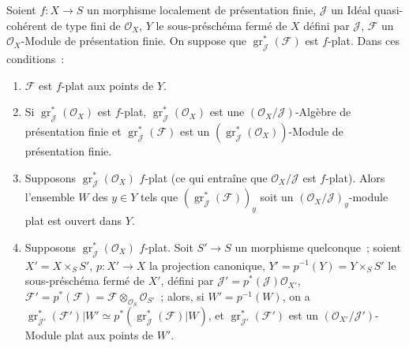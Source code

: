 \begin{proposition}[11.3.4]
Soient $f:X\to S$ un morphisme localement de présentation finie, $\mathcal J$
un Idéal quasi-cohérent de type fini de $\mathcal O_X$, $Y$ le sous-préschéma
fermé de $X$ défini par $\mathcal J$, $\mathcal F$ un $\mathcal O_X$-Module de
présentation finie. On suppose que $\operatorname{gr}_{\mathcal J}^*(\mathcal F)$
est $f$-plat. Dans ces conditions~:
\begin{enumerate}[label=\emph{(\roman*)}]
\item $\mathcal F$ est $f$-plat aux points de $Y$.
\item Si $\operatorname{gr}_{\mathcal J}^*(\mathcal O_X)$ est $f$-plat,
$\operatorname{gr}_{\mathcal J}^*(\mathcal O_X)$ est une
$(\mathcal O_X/\mathcal J)$-Algèbre de présentation finie et
$\operatorname{gr}_{\mathcal J}^*(\mathcal F)$ est un
$(\operatorname{gr}_{\mathcal J}^*(\mathcal O_X))$-Module de présentation
finie.
\item Supposons $\operatorname{gr}_{\mathcal J}^*(\mathcal O_X)$ $f$-plat
(ce qui entraîne que $\mathcal O_X/\mathcal J$ est $f$-plat). Alors l'ensemble
$W$ des $y\in Y$ tels que $(\operatorname{gr}_{\mathcal J}^*(\mathcal F))_y$
soit un $(\mathcal O_X/\mathcal J)_y$-module plat est ouvert dans $Y$.
\item Supposons $\operatorname{gr}_{\mathcal J}^*(\mathcal O_X)$ $f$-plat.
Soit $S'\to S$ un morphisme quelconque~; soient $X'=X\times_SS'$,
$p:X'\to X$ la projection canonique, $Y'=p^{-1}(Y)=Y\times_SS'$ le
sous-préschéma fermé de $X'$, défini par
$\mathcal J'=p^*(\mathcal J)\mathcal O_{X'}$, $\mathcal F'=p^*(\mathcal F)
=\mathcal F\otimes_{\mathcal O_S}\mathcal O_{S'}$~; alors, si
$W'=p^{-1}(W)$, on a
$\operatorname{gr}_{\mathcal J'}^*(\mathcal F')|W'
\simeq p^*(\operatorname{gr}_{\mathcal J}^*(\mathcal F)|W)$, et
$\operatorname{gr}_{\mathcal J'}^*(\mathcal F')$ est un
$(\mathcal O_{X'}/\mathcal J')$-Module plat aux points de $W'$.
\end{enumerate}
\end{proposition}

